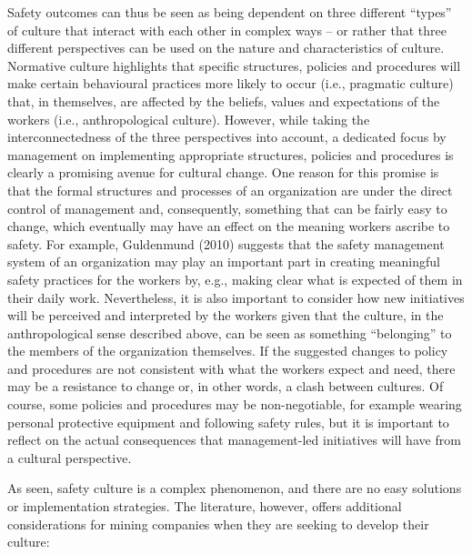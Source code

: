\documentclass[
  12pt,
]{scrbook}
\begin{document}
Safety outcomes can thus be seen as being dependent on three different ``types'' of culture that interact with each other in complex ways -- or rather that three different perspectives can be used on the nature and characteristics of culture. Normative culture highlights that specific structures, policies and procedures will make certain behavioural practices more likely to occur (i.e., pragmatic culture) that, in themselves, are affected by the beliefs, values and expectations of the workers (i.e., anthropological culture). However, while taking the interconnectedness of the three perspectives into account, a dedicated focus by management on implementing appropriate structures, policies and procedures is clearly a promising avenue for cultural change. One reason for this promise is that the formal structures and processes of an organization are under the direct control of management and, consequently, something that can be fairly easy to change, which eventually may have an effect on the meaning workers ascribe to safety. For example, Guldenmund (2010) suggests that the safety management system of an organization may play an important part in creating meaningful safety practices for the workers by, e.g., making clear what is expected of them in their daily work. Nevertheless, it is also important to consider how new initiatives will be perceived and interpreted by the workers given that the culture, in the anthropological sense described above, can be seen as something ``belonging'' to the members of the organization themselves. If the suggested changes to policy and procedures are not consistent with what the workers expect and need, there may be a resistance to change or, in other words, a clash between cultures. Of course, some policies and procedures may be non-negotiable, for example wearing personal protective equipment and following safety rules, but it is important to reflect on the actual consequences that management-led initiatives will have from a cultural perspective.

As seen, safety culture is a complex phenomenon, and there are no easy solutions or implementation strategies. The literature, however, offers additional considerations for mining companies when they are seeking to develop their culture:
\end{document}
